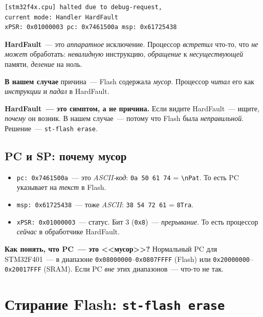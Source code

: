 \begin{verbatim}
[stm32f4x.cpu] halted due to debug-request,
current mode: Handler HardFault
xPSR: 0x01000003 pc: 0x7461500a msp: 0x61725438
\end{verbatim}

\textbf{HardFault}~--- это \emph{аппаратное} исключение.
Процессор \emph{встретил} что-то, что \emph{не может}
обработать: \emph{невалидную} инструкцию, \emph{обращение}
к \emph{несуществующей} памяти, \emph{деление} на ноль.

\textbf{В нашем случае} причина~--- Flash содержала
\emph{мусор}. Процессор \emph{читал} его как
\emph{инструкции} и \emph{падал} в HardFault.

\begin{keybox}
\textbf{HardFault~--- это симптом, а не причина.}
Если видите HardFault~--- ищите, \emph{почему} он
возник. В нашем случае~--- потому что Flash была
\emph{неправильной}. Решение~--- \texttt{st-flash erase}.
\end{keybox}

\subsection{PC и SP: почему мусор}

\begin{itemize}
    \item \texttt{pc: 0x7461500a}~--- это \emph{ASCII-код}:
          \texttt{0a 50 61 74} = \texttt{\textbackslash nPat}.
          То есть PC указывает на \emph{текст} в Flash.
    \item \texttt{msp: 0x61725438}~--- тоже \emph{ASCII}:
          \texttt{38 54 72 61} = \texttt{8Tra}.
    \item \texttt{xPSR: 0x01000003}~--- статус. Бит 3
          (\texttt{0x8})~--- \emph{прерывание}. То есть
          процессор \emph{сейчас} в обработчике HardFault.
\end{itemize}

\begin{ideabox}
\textbf{Как понять, что PC~--- это <<мусор>>?} Нормальный
PC для STM32F401~--- в диапазоне \texttt{0x08000000}–\texttt{0x0807FFFF}
(Flash) или \texttt{0x20000000}–\texttt{0x20017FFF} (SRAM).
Если PC \emph{вне} этих диапазонов~--- что-то не так.
\end{ideabox}

\section{Стирание Flash: \texttt{st-flash erase}}
\label{sec:flashing-erase}

